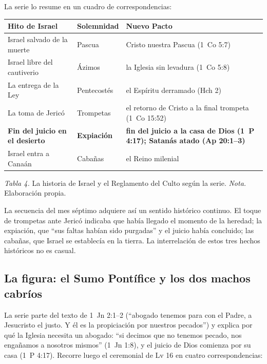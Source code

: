 \documentclass[11pt,letterpaper]{article}
\begin{document}
La serie lo resume en un cuadro de correspondencias:

\begin{center}\small\renewcommand{\arraystretch}{1.18}
\begin{tabular}{@{}L{4.6cm}L{3.4cm}L{6.6cm}@{}}
\toprule
\textbf{Hito de Israel} & \textbf{Solemnidad} & \textbf{Nuevo Pacto} \\ \midrule
Israel salvado de la muerte & Pascua & Cristo nuestra Pascua (1~Co 5:7) \\
Israel libre del cautiverio & Ázimos & la Iglesia sin levadura (1~Co 5:8) \\
La entrega de la Ley & Pentecostés & el Espíritu derramado (Hch 2) \\
La toma de Jericó & Trompetas & el retorno de Cristo a la final trompeta (1~Co 15:52) \\
\textbf{Fin del juicio en el desierto} & \textbf{Expiación} & \textbf{fin del juicio a la casa de Dios (1~P 4:17); Satanás atado (Ap 20:1--3)} \\
Israel entra a Canaán & Cabañas & el Reino milenial \\
\bottomrule
\end{tabular}\par
{\footnotesize\color{sepia}\textit{Tabla 4.} La historia de Israel y el Reglamento del Culto según la serie. \textit{Nota.} Elaboración propia.}
\end{center}

La secuencia del mes séptimo adquiere así un sentido histórico continuo. El toque de trompetas ante Jericó indicaba que había llegado el momento de la heredad; la expiación, que ``sus faltas habían sido purgadas'' y el juicio había concluido; las cabañas, que Israel se establecía en la tierra. La interrelación de estos tres hechos históricos no es casual.

\subsection{La figura: el Sumo Pontífice y los dos machos cabríos}
La serie parte del texto de 1~Jn 2:1--2 (``abogado tenemos para con el Padre, a Jesucristo el justo. Y él es la propiciación por nuestros pecados'') y explica por qué la Iglesia necesita un abogado: ``si decimos que no tenemos pecado, nos engañamos a nosotros mismos'' (1~Jn 1:8), y el juicio de Dios comienza por su casa (1~P 4:17). Recorre luego el ceremonial de Lv 16 en cuatro correspondencias:
\end{document}
